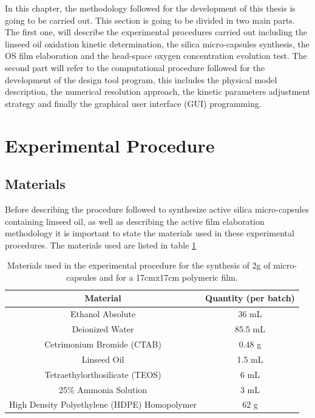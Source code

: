 \begin{refsection}
In this chapter, the methodology followed for the development of this thesis is going to be carried out. This section is going to be divided in two main parts. The first one, will describe the experimental procedures carried out including the linseed oil oxidation kinetic determination, the silica micro-capsules synthesis, the OS film elaboration and the head-space oxygen concentration evolution test. The second part will refer to the computational procedure followed for the development of the design tool program, this includes the physical model description, the numerical resolution approach, the kinetic parameters adjustment strategy and finally the graphical user interface (GUI) programming. 

\section[Exp.Procedure]{Experimental Procedure}
\subsection{Materials}\label{subsec:materials}
Before describing the procedure followed to synthesize active silica micro-capsules containing linseed oil, as well as describing the active film elaboration methodology it is important to state the materials used in these experimental procedures. The materials used are listed in table \ref{tab:material}

\begin{table}[h]
\centering
\caption{Materials used in the experimental procedure for the synthesis of 2g of micro-capsules and for a 17cmx17cm polymeric film.}
\label{tab:material}
\begin{tabular}{|c|c|}
\hline
Material                        & Quantity (per batch) \\ \hline
Ethanol  Absolute               & 36 mL                \\ \hline
Deionized  Water                & 85.5 mL              \\ \hline
Cetrimonium  Bromide (CTAB)     & 0.48 g               \\ \hline
Linseed  Oil                    & 1.5 mL               \\ \hline
Tetraethylorthosilicate  (TEOS) & 6 mL                 \\ \hline
25\% Ammonia Solution           & 3 mL                 \\ \hline
High Density Polyethylene (HDPE) Homopolymer & 62 g            \\ \hline
\end{tabular}
\end{table}




\end{refsection}
